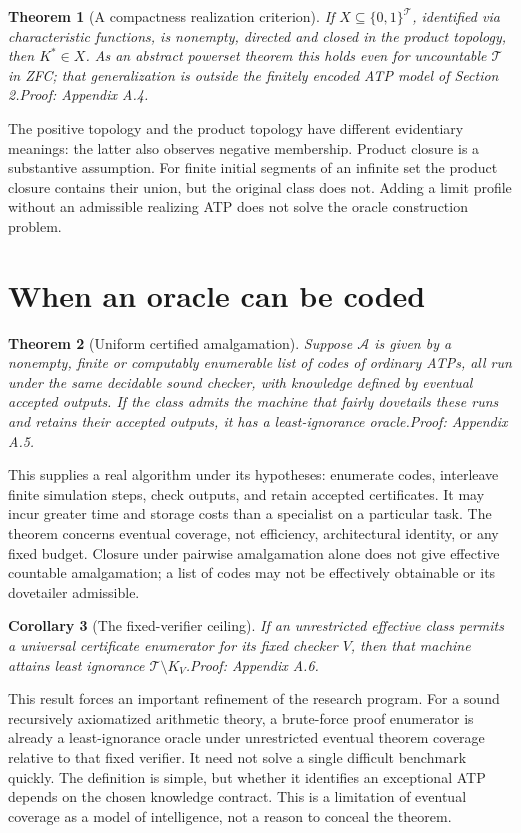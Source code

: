 \documentclass[11pt]{article}
\newtheorem{theorem}{Theorem}[section]
\newtheorem{corollary}[theorem]{Corollary}
\newcommand{\T}{\mathcal T}\newcommand{\K}{\mathcal K}\newcommand{\I}{\mathcal I}\newcommand{\A}{\mathcal A}
\newcommand{\pf}[1]{\unskip\hspace{.6em plus 1fill}\textit{Proof: Appendix A.#1.}}
\begin{document}
\begin{theorem}[A compactness realization criterion]\label{th:compact}
If $X\subseteq\{0,1\}^{\T}$, identified via characteristic functions, is nonempty, directed and closed in the product topology, then $K^*\in X$. As an abstract powerset theorem this holds even for uncountable $\T$ in ZFC; that generalization is outside the finitely encoded ATP model of Section 2.\pf{4}
\end{theorem}
The positive topology and the product topology have different evidentiary meanings: the latter also observes negative membership. Product closure is a substantive assumption. For finite initial segments of an infinite set the product closure contains their union, but the original class does not. Adding a limit profile without an admissible realizing ATP does not solve the oracle construction problem.

\section{When an oracle can be coded}
\begin{theorem}[Uniform certified amalgamation]\label{th:amalg}
Suppose $\A$ is given by a nonempty, finite or computably enumerable list of codes of ordinary ATPs, all run under the same decidable sound checker, with knowledge defined by eventual accepted outputs. If the class admits the machine that fairly dovetails these runs and retains their accepted outputs, it has a least-ignorance oracle.\pf{5}
\end{theorem}
This supplies a real algorithm under its hypotheses: enumerate codes, interleave finite simulation steps, check outputs, and retain accepted certificates. It may incur greater time and storage costs than a specialist on a particular task. The theorem concerns eventual coverage, not efficiency, architectural identity, or any fixed budget. Closure under pairwise amalgamation alone does not give effective countable amalgamation; a list of codes may not be effectively obtainable or its dovetailer admissible.

\begin{corollary}[The fixed-verifier ceiling]\label{th:ceiling}
If an unrestricted effective class permits a universal certificate enumerator for its fixed checker $V$, then that machine attains least ignorance $\T\setminus K_V$.\pf{6}
\end{corollary}
This result forces an important refinement of the research program. For a sound recursively axiomatized arithmetic theory, a brute-force proof enumerator is already a least-ignorance oracle under unrestricted eventual theorem coverage relative to that fixed verifier. It need not solve a single difficult benchmark quickly. The definition is simple, but whether it identifies an exceptional ATP depends on the chosen knowledge contract. This is a limitation of eventual coverage as a model of intelligence, not a reason to conceal the theorem.
\end{document}
